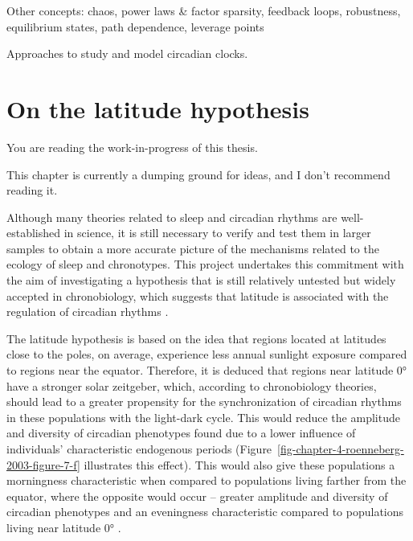 \documentclass[
12pt,
openright,
oneside,
a4paper,
chapter=TITLE,
section=TITLE,
french,
spanish,
brazil,
english
]{abntex2}\usepackage{array}
\newcommand{\microskip}{\vspace{\microskipamount}}
\begin{document}
Other concepts: chaos, power laws \& factor sparsity, feedback loops,
robustness, equilibrium states, path dependence, leverage points

Approaches to study and model circadian clocks.


\chapter{On the latitude hypothesis}\label{on-the-latitude-hypothesis}

\begin{tcolorbox}[enhanced jigsaw, colframe=quarto-callout-important-color-frame, rightrule=.15mm, opacitybacktitle=0.6, toprule=.15mm, opacityback=0, toptitle=1mm, bottomtitle=1mm, breakable, leftrule=.75mm, title=\textcolor{quarto-callout-important-color}{\faExclamation}\hspace{0.5em}{Important}, coltitle=black, bottomrule=.15mm, arc=.35mm, titlerule=0mm, left=2mm, colback=white, colbacktitle=quarto-callout-important-color!10!white]

You are reading the work-in-progress of this thesis.

\microskip

This chapter is currently a dumping ground for ideas, and I don't
recommend reading it.

\end{tcolorbox}

Although many theories related to sleep and circadian rhythms are
well-established in science, it is still necessary to verify and test
them in larger samples to obtain a more accurate picture of the
mechanisms related to the ecology of sleep and chronotypes. This project
undertakes this commitment with the aim of investigating a hypothesis
that is still relatively untested but widely accepted in chronobiology,
which suggests that latitude is associated with the regulation of
circadian rhythms
\autocite{hut2013,leocadio-miguel2014,leocadio-miguel2017,pittendrigh1991,randler2008,randler2017,roenneberg2003}.

The latitude hypothesis is based on the idea that regions located at
latitudes close to the poles, on average, experience less annual
sunlight exposure compared to regions near the equator. Therefore, it is
deduced that regions near latitude 0° have a stronger solar zeitgeber,
which, according to chronobiology theories, should lead to a greater
propensity for the synchronization of circadian rhythms in these
populations with the light-dark cycle. This would reduce the amplitude
and diversity of circadian phenotypes found due to a lower influence of
individuals' characteristic endogenous periods
(Figure~\ref{fig-chapter-4-roenneberg-2003-figure-7-f} illustrates this
effect). This would also give these populations a morningness
characteristic when compared to populations living farther from the
equator, where the opposite would occur -- greater amplitude and
diversity of circadian phenotypes and an eveningness characteristic
compared to populations living near latitude 0°
\autocite{roenneberg2003}.
\end{document}

